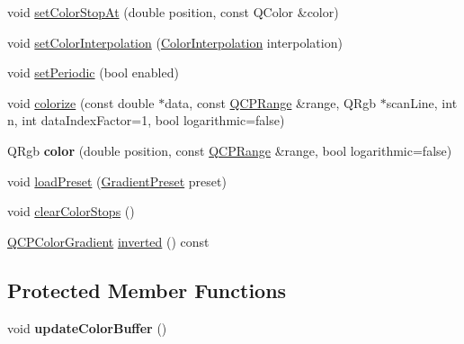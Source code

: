 \begin{DoxyCompactItemize}
\item 
void \hyperlink{class_q_c_p_color_gradient_a3b48be5e78079db1bb2a1188a4c3390e}{set\+Color\+Stop\+At} (double position, const Q\+Color \&color)
\item 
void \hyperlink{class_q_c_p_color_gradient_aa13fda86406e1d896a465a409ae63b38}{set\+Color\+Interpolation} (\hyperlink{class_q_c_p_color_gradient_ac5dca17cc24336e6ca176610e7f77fc1}{Color\+Interpolation} interpolation)
\item 
void \hyperlink{class_q_c_p_color_gradient_a39d6448155fc00a219f239220d14bb39}{set\+Periodic} (bool enabled)
\item 
void \hyperlink{class_q_c_p_color_gradient_aaf423ceb943e177b0ed2c48c811d83dc}{colorize} (const double $\ast$data, const \hyperlink{class_q_c_p_range}{Q\+C\+P\+Range} \&range, Q\+Rgb $\ast$scan\+Line, int n, int data\+Index\+Factor=1, bool logarithmic=false)
\item 
\mbox{\label{class_q_c_p_color_gradient_a0599545c859268b025d2060dea741cea}} 
Q\+Rgb {\bfseries color} (double position, const \hyperlink{class_q_c_p_range}{Q\+C\+P\+Range} \&range, bool logarithmic=false)
\item 
void \hyperlink{class_q_c_p_color_gradient_aa0aeec1528241728b9671bf8e60b1622}{load\+Preset} (\hyperlink{class_q_c_p_color_gradient_aed6569828fee337023670272910c9072}{Gradient\+Preset} preset)
\item 
void \hyperlink{class_q_c_p_color_gradient_a939213e85f0d1279519d555c5fcfb6ad}{clear\+Color\+Stops} ()
\item 
\hyperlink{class_q_c_p_color_gradient}{Q\+C\+P\+Color\+Gradient} \hyperlink{class_q_c_p_color_gradient_a9f72f501de429829ec446333316decda}{inverted} () const
\end{DoxyCompactItemize}
\subsection*{Protected Member Functions}
\begin{DoxyCompactItemize}
\item 
\mbox{\label{class_q_c_p_color_gradient_a353f15ab3ab586eebf1f6b58c3e2707b}} 
void {\bfseries update\+Color\+Buffer} ()
\end{DoxyCompactItemize}
